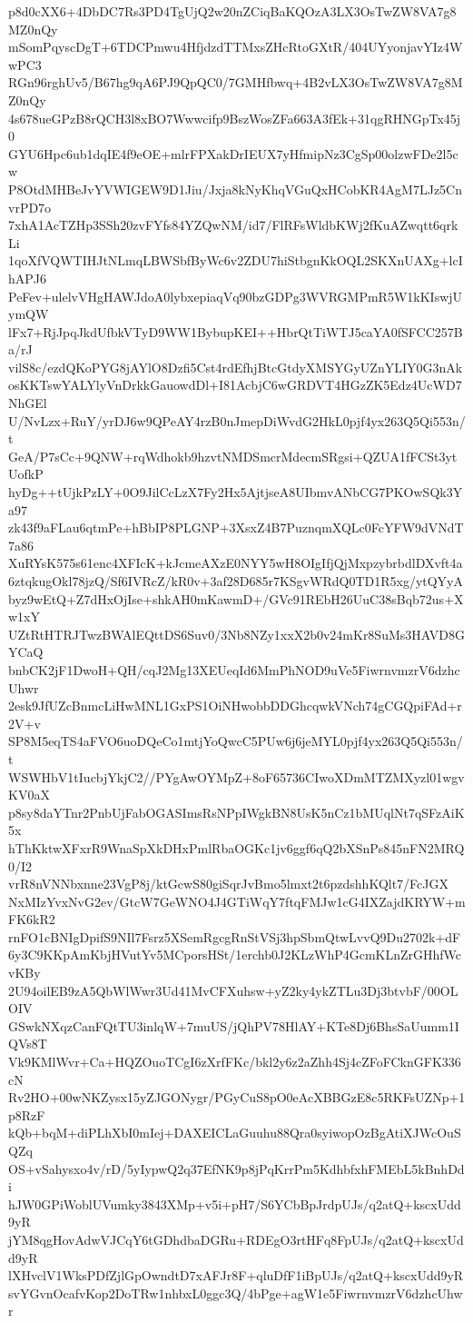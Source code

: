 p8d0cXX6+4DbDC7Rs3PD4TgUjQ2w20nZCiqBaKQOzA3LX3OsTwZW8VA7g8MZ0nQy
mSomPqyscDgT+6TDCPmwu4HfjdzdTTMxsZHcRtoGXtR/404UYyonjavYIz4WwPC3
RGn96rghUv5/B67hg9qA6PJ9QpQC0/7GMHfbwq+4B2vLX3OsTwZW8VA7g8MZ0nQy
4s678ueGPzB8rQCH3l8xBO7Wwwcifp9BszWosZFa663A3fEk+31qgRHNGpTx45j0
GYU6Hpc6ub1dqIE4f9eOE+mlrFPXakDrIEUX7yHfmipNz3CgSp00olzwFDe2l5cw
P8OtdMHBeJvYVWIGEW9D1Jiu/Jxja8kNyKhqVGuQxHCobKR4AgM7LJz5CnvrPD7o
7xhA1AcTZHp3SSh20zvFYfs84YZQwNM/id7/FlRFsWldbKWj2fKuAZwqtt6qrkLi
1qoXfVQWTIHJtNLmqLBWSbfByWc6v2ZDU7hiStbgnKkOQL2SKXnUAXg+lcIhAPJ6
PeFev+ulelvVHgHAWJdoA0lybxepiaqVq90bzGDPg3WVRGMPmR5W1kKIswjUymQW
lFx7+RjJpqJkdUfbkVTyD9WW1BybupKEI++HbrQtTiWTJ5caYA0fSFCC257Ba/rJ
vilS8c/ezdQKoPYG8jAYlO8Dzfi5Cst4rdEfhjBtcGtdyXMSYGyUZnYLIY0G3nAk
osKKTswYALYlyVnDrkkGauowdDl+I81AcbjC6wGRDVT4HGzZK5Edz4UcWD7NhGEl
U/NvLzx+RuY/yrDJ6w9QPeAY4rzB0nJmepDiWvdG2HkL0pjf4yx263Q5Qi553n/t
GeA/P7sCc+9QNW+rqWdhokb9hzvtNMDSmcrMdecmSRgsi+QZUA1fFCSt3ytUofkP
hyDg++tUjkPzLY+0O9JilCcLzX7Fy2Hx5AjtjseA8UIbmvANbCG7PKOwSQk3Ya97
zk43f9aFLau6qtmPe+hBbIP8PLGNP+3XsxZ4B7PuznqmXQLc0FcYFW9dVNdT7a86
XuRYsK575s61enc4XFIcK+kJcmeAXzE0NYY5wH8OIgIfjQjMxpzybrbdlDXvft4a
6ztqkugOkl78jzQ/Sf6IVRcZ/kR0v+3af28D685r7KSgvWRdQ0TD1R5xg/ytQYyA
byz9wEtQ+Z7dHxOjIse+shkAH0mKawmD+/GVc91REbH26UuC38sBqb72us+Xw1xY
UZtRtHTRJTwzBWAlEQttDS6Suv0/3Nb8NZy1xxX2b0v24mKr8SuMs3HAVD8GYCaQ
bnbCK2jF1DwoH+QH/cqJ2Mg13XEUeqId6MmPhNOD9uVe5FiwrnvmzrV6dzhcUhwr
2esk9JfUZcBnmcLiHwMNL1GxPS1OiNHwobbDDGhcqwkVNch74gCGQpiFAd+r2V+v
SP8M5eqTS4aFVO6uoDQeCo1mtjYoQwcC5PUw6j6jeMYL0pjf4yx263Q5Qi553n/t
WSWHbV1tIucbjYkjC2//PYgAwOYMpZ+8oF65736CIwoXDmMTZMXyzl01wgvKV0aX
p8sy8daYTnr2PnbUjFabOGASImsRsNPpIWgkBN8UsK5nCz1bMUqlNt7qSFzAiK5x
hThKktwXFxrR9WnaSpXkDHxPmlRbaOGKc1jv6ggf6qQ2bXSnPs845nFN2MRQ0/I2
vrR8nVNNbxnne23VgP8j/ktGcwS80giSqrJvBmo5lmxt2t6pzdshhKQlt7/FcJGX
NxMIzYvxNvG2ev/GtcW7GeWNO4J4GTiWqY7ftqFMJw1cG4IXZajdKRYW+mFK6kR2
rnFO1cBNIgDpifS9NIl7Fsrz5XSemRgcgRnStVSj3hpSbmQtwLvvQ9Du2702k+dF
6y3C9KKpAmKbjHVutYv5MCporsHSt/1erchb0J2KLzWhP4GcmKLnZrGHhfWcvKBy
2U94oilEB9zA5QbWlWwr3Ud41MvCFXuhsw+yZ2ky4ykZTLu3Dj3btvbF/00OLOIV
GSwkNXqzCanFQtTU3inlqW+7muUS/jQhPV78HlAY+KTe8Dj6BhsSaUumm1IQVs8T
Vk9KMlWvr+Ca+HQZOuoTCgI6zXrfFKc/bkl2y6z2aZhh4Sj4cZFoFCknGFK336cN
Rv2HO+00wNKZysx15yZJGONygr/PGyCuS8pO0eAcXBBGzE8c5RKFsUZNp+1p8RzF
kQb+bqM+diPLhXbI0mIej+DAXEICLaGuuhu88Qra0syiwopOzBgAtiXJWcOuSQZq
OS+vSahysxo4v/rD/5yIypwQ2q37EfNK9p8jPqKrrPm5KdhbfxhFMEbL5kBnhDdi
hJW0GPiWoblUVumky3843XMp+v5i+pH7/S6YCbBpJrdpUJs/q2atQ+kscxUdd9yR
jYM8qgHovAdwVJCqY6tGDhdbaDGRu+RDEgO3rtHFq8FpUJs/q2atQ+kscxUdd9yR
lXHvclV1WksPDfZjlGpOwndtD7xAFJr8F+qluDfF1iBpUJs/q2atQ+kscxUdd9yR
svYGvnOcafvKop2DoTRw1nhbxL0ggc3Q/4bPge+agW1e5FiwrnvmzrV6dzhcUhwr
